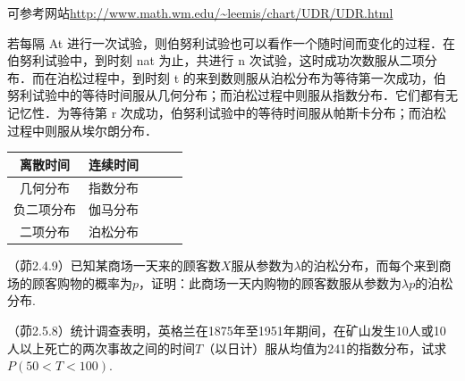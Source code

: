 可参考网站\url{http://www.math.wm.edu/~leemis/chart/UDR/UDR.html}


若每隔 At 进行一次试验，则伯努利试验也可以看作一个随时间而变化的过程．在伯努利试验中，到时刻 nat 为止，共进行 n 次试验，这时成功次数服从二项分布．而在泊松过程中，到时刻 t 的来到数则服从泊松分布为等待第一次成功，伯努利试验中的等待时间服从几何分布；而泊松过程中则服从指数分布．它们都有无记忆性．为等待第 r 次成功，伯努利试验中的等待时间服从帕斯卡分布；而泊松过程中则服从埃尔朗分布．
\begin{table}[]
    \centering
    \begin{tabular}{ccccc}
        \toprule
        离散时间   & 连续时间 \\
        \midrule
        几何分布   & 指数分布 \\
        负二项分布 & 伽马分布 \\
        二项分布   & 泊松分布 \\
        \bottomrule
    \end{tabular}
\end{table}
\FloatBarrier

\begin{problemset}[错题记录]
    \item （茆2.4.9）已知某商场一天来的顾客数$X$服从参数为$\lambda$的泊松分布，而每个来到商场的顾客购物的概率为$p$，证明：此商场一天内购物的顾客数服从参数为$\lambda p$的泊松分布.
    \item （茆2.5.8）统计调查表明，英格兰在1875年至1951年期间，在矿山发生10人或10人以上死亡的两次事故之间的时间$T$（以日计）服从均值为241的指数分布，试求$P(50<T<100)$.
    \item
\end{problemset}
